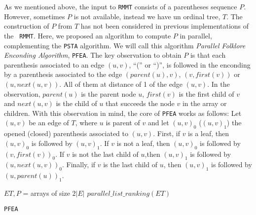 As we mentioned above, the input to {\tt RMMT} consists of a
parentheses sequence $P$. However, sometimes $P$ is not available,
instead we have un ordinal tree, $T$. The construction of $P$ from $T$
has not been considered in previous implementations of the {\tt
  RMMT}. Here, we proposed an algorithm to compute $P$ in parallel,
complementing the {\tt PSTA} algorithm. We will call this algorithm
\emph{Parallel Folklore Enconding Algorithm}, {\tt PFEA}. The key
observation to obtain $P$ is that each parenthesis associated to an
edge $(u,v)$, ``('' or ``)'', is followed in the enconding by a
parenthesis associated to the edge $(parent(u), v)$, $(v, first(v))$
or $(u, next(u,v))$. All of them at distance of 1 of the edge
$(u,v)$. In the observation, $parent(u)$ is the parent node $u$,
$first(v)$ is the first child of $v$ and $next(u,v)$ is the child of
$u$ that succeeds the node $v$ in the array or children. With this
observation in mind, the core of {\tt PFEA} works as follows: Let
$(u,v)$ be an edge of $T$, where $u$ is parent of $v$ and let
$(u,v)_{0}$ ($(u,v)_{1}$) the opened (closed) parenthesis associated
to $(u,v)$. First, if $v$ is a leaf, then $(u,v)_{0}$ is followed by
$(u,v)_{1}$. If $v$ is not a leaf, then $(u,v)_{0}$ is followed by
$(v,first(v))_{0}$. If $v$ is not the last child of $u$,then
$(u,v)_{1}$ is followed by $(u,next(u,v))_{0}$. Finally, if $v$ is the
last child of $u$, then $(u,v)_{1}$ is followed by
$(u,parent(u))_{1}$. 

\begin{algorithm}[t]
\small
\SetVlineSkip{-2cm}
  \LinesNumbered
  \SetAlgoNoEnd
  \DontPrintSemicolon
  \BlankLine%
  $ET, P$ = arrays of size $2|E|$\;
  \BlankLine
  $parallel\_list\_ranking(ET)$\;
  \BlankLine
  \caption{{\tt PFEA}}
  \label{algo:PFEA}
\end{algorithm}
\normalsize

